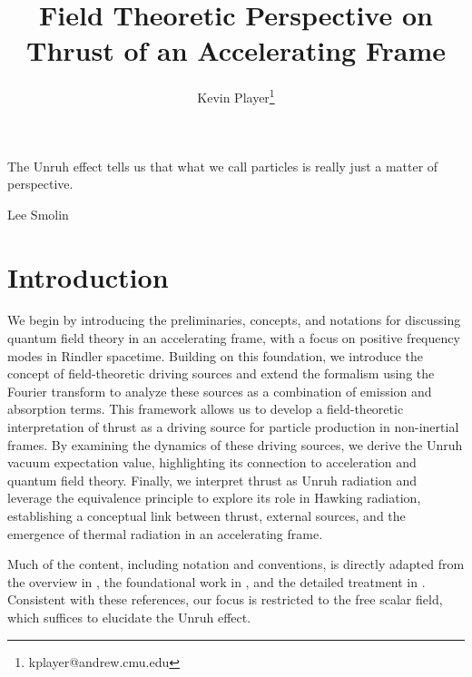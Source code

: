 \documentclass[12pt,a4paper]{article}
\begin{document}
\title{Field Theoretic Perspective on Thrust of an Accelerating Frame}
\author[1]{Kevin Player\footnote{kplayer@andrew.cmu.edu}}

\maketitle

\epigraph{The Unruh effect tells us that what we call particles is really just a matter of perspective.}{Lee Smolin}



\section{Introduction}

We begin by introducing the preliminaries, concepts, and notations for discussing quantum field theory in an accelerating frame, with a focus on positive frequency modes in Rindler spacetime. Building on this foundation, we introduce the concept of field-theoretic driving sources and extend the formalism using the Fourier transform to analyze these sources as a combination of emission and absorption terms. This framework allows us to develop a field-theoretic interpretation of thrust as a driving source for particle production in non-inertial frames. By examining the dynamics of these driving sources, we derive the Unruh vacuum expectation value, highlighting its connection to acceleration and quantum field theory. Finally, we interpret thrust as Unruh radiation and leverage the equivalence principle to explore its role in Hawking radiation, establishing a conceptual link between thrust, external sources, and the emergence of thermal radiation in an accelerating frame.

Much of the content, including notation and conventions, is directly adapted from the overview in \cite{Frodden}, the foundational work in \cite{unruh}, and the detailed treatment in \cite{beisert}. Consistent with these references, our focus is restricted to the free scalar field, which suffices to elucidate the Unruh effect.
\end{document}
